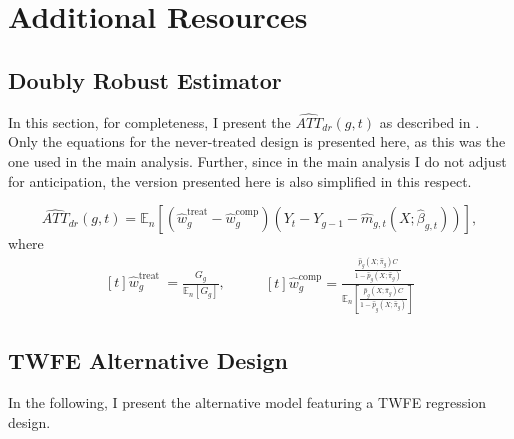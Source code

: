 \appendix

\chapter{Additional Resources}
\label{app:chapter_additional_resources}

\section{Doubly Robust Estimator}
\label{app:drdeep}

In this section, for completeness, I present the $\widehat{A T T}_{d r}(g, t)$ as 
described in \textcite[Section 4]{cs2021did_mtp}. Only the equations for the never-treated 
design is presented here, as this was the one used in the main analysis. Further, since
in the main analysis I do not adjust for anticipation, the version presented here
is also simplified in this respect.

\begin{equation}
    \widehat{A T T}_{d r}(g, t)=\mathbb{E}_n\left[\left(\widehat{w}_g^{\text{treat}}-\widehat{w}_g^{\text{comp}}\right)\left(Y_t-Y_{g-1}-\widehat{m}_{g, t}\left(X; \widehat{\beta}_{g, t}\right)\right)\right],
    \label{eq:attdr}
\end{equation}
where 
\begin{equation}
    \begin{aligned}[t]
        \widehat{w}_g^{\text {treat }}=\frac{G_g}{\mathbb{E}_n\left[G_g\right]},
    \end{aligned}\qquad
    \begin{aligned}[t]
        \widehat{w}_g^{\text{comp}}=\frac{\frac{\widehat{p}_g\left(X ; \widehat{\pi}_g\right) C}{1-\widehat{p}_g\left(X ; \widehat{\pi}_g\right)}}{\mathbb{E}_n\left[\frac{\widehat{p}_g\left(X ; \widehat{\pi}_g\right) C}{1-\widehat{p}_g\left(X ; \widehat{\pi}_g\right)}\right]}
        \label{eq:wgtreatcomp}
    \end{aligned}
\end{equation}

\section{TWFE Alternative Design}
\label{app:twfe}

In the following, I present the alternative model featuring a TWFE regression design. 

